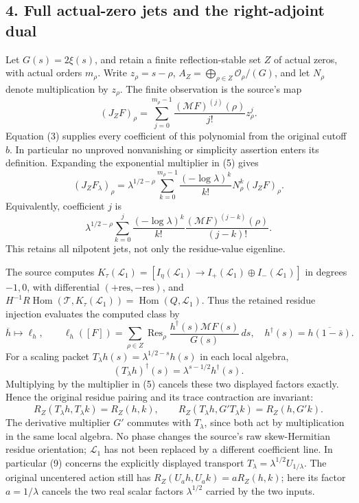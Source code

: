 \documentclass[10pt,a4paper,oneside]{report}
\begin{document}
\subsection{4. Full actual-zero jets and the right-adjoint
dual}\label{proof09:full-actual-zero-jets-and-the-right-adjoint-dual}

Let \(G(s)=2\xi(s)\), and retain a finite reflection-stable set \(Z\) of
actual zeros, with actual orders \(m_\rho\). Write \(z_\rho=s-\rho\),
\(A_Z=\bigoplus_{\rho\in Z}\mathcal O_\rho/(G)\), and let \(N_\rho\)
denote multiplication by \(z_\rho\). The finite observation is the
source's map \[
(J_ZF)_\rho=\sum_{j=0}^{m_\rho-1}\frac{(\mathcal MF)^{(j)}(\rho)}{j!}z_\rho^j.
\] Equation (3) supplies every coefficient of this polynomial from the
original cutoff \(b\). In particular no unproved nonvanishing or
simplicity assertion enters its definition. Expanding the exponential
multiplier in (5) gives \[
\boxed{(J_ZF_\lambda)_\rho=\lambda^{1/2-\rho}
\sum_{k=0}^{m_\rho-1}\frac{(-\log\lambda)^k}{k!}N_\rho^k(J_ZF)_\rho.}
\tag{7}
\] Equivalently, coefficient \(j\) is \[
\lambda^{1/2-\rho}\sum_{k=0}^j
\frac{(-\log\lambda)^k}{k!}
\frac{(\mathcal MF)^{(j-k)}(\rho)}{(j-k)!}.
\] This retains all nilpotent jets, not only the residue-value
eigenline.

The source computes
\(K_\tau(\mathcal L_1)=[I_\eta(\mathcal L_1)\to I_+(\mathcal L_1)\oplus I_-(\mathcal L_1)]\)
in degrees \(-1,0\), with differential
\((+\mathrm{res},-\mathrm{res})\), and
\(H^{-1}R\operatorname{Hom}(\mathcal T,K_\tau(\mathcal L_1))=\operatorname{Hom}(Q,\mathcal L_1)\).
Thus the retained residue injection evaluates the computed class by \[
\overline h\longmapsto\ell_h,\qquad
\ell_h([F])=\sum_{\rho\in Z}\operatorname{Res}_\rho
\frac{h^\dagger(s)\mathcal MF(s)}{G(s)}\,ds,
\quad h^\dagger(s)=\overline{h(1-\bar s)}.
\tag{8}
\] For a scaling packet \(T_\lambda h(s)=\lambda^{1/2-s}h(s)\) in each
local algebra, \[
(T_\lambda h)^\dagger(s)=\lambda^{s-1/2}h^\dagger(s).
\] Multiplying by the multiplier in (5) cancels these two displayed
factors exactly. Hence the original residue pairing and its trace
contraction are invariant: \[
R_Z(T_\lambda h,T_\lambda k)=R_Z(h,k),\qquad
R_Z(T_\lambda h,G'T_\lambda k)=R_Z(h,G'k).
\tag{9}
\] The derivative multiplier \(G'\) commutes with \(T_\lambda\), since
both act by multiplication in the same local algebra. No phase changes
the source's raw skew-Hermitian residue orientation; \(\mathcal L_1\)
has not been replaced by a different coefficient line. In particular (9)
concerns the explicitly displayed transport
\(T_\lambda=\lambda^{1/2}U_{1/\lambda}\). The original uncentered action
still has \(R_Z(U_ah,U_ak)=aR_Z(h,k)\); here its factor \(a=1/\lambda\)
cancels the two real scalar factors \(\lambda^{1/2}\) carried by the two
inputs.
\end{document}
